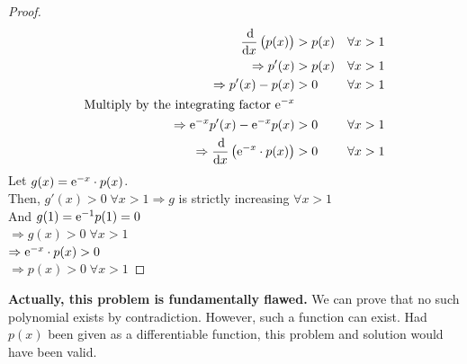 \documentclass[14]{article}
\theoremstyle{definition}
\begin{document}
\begin{proof}
\begin{align*}
\dfrac{\dif}{\dif x} \left(p(x)\right) &> p(x) && \forall x > 1\\
\Rightarrow p'(x) &> p(x) && \forall x > 1\\
\Rightarrow p'(x) - p(x) &> 0 && \forall x > 1\\
\text{Multiply by the integrating factor } {\rm e}^{-x}\\
\Rightarrow {\rm e}^{-x} p'(x) - {\rm e}^{-x} p(x) &> 0 && \forall x > 1\\
\Rightarrow \dfrac{\dif}{\dif x} \left( {\rm e}^{-x} \cdot p(x) \right) &>0 && \forall x > 1
\end{align*}
Let $g(x) = {\rm e}^{-x}\cdot p(x)$.\\
Then, $g'(x) > 0 \; \forall x > 1 \Rightarrow g$ is strictly increasing $\forall x > 1$\\
And $g(1) = {\rm e}^{-1} p(1) = 0$\\
$\Rightarrow g(x) > 0 \; \forall x > 1$\\
$\Rightarrow {\rm e}^{-x} \cdot p(x) > 0$\\ 
$\Rightarrow p(x) > 0 \; \forall x > 1$
\end{proof}
\textbf{Actually, this problem is fundamentally flawed.} We can prove that no such polynomial exists by contradiction. However, such a function can exist. Had $p(x)$ been given as a differentiable function, this problem and solution would have been valid.
\end{document}
